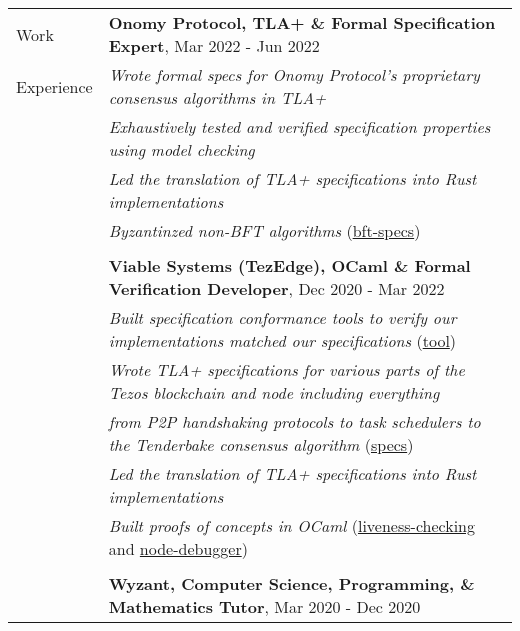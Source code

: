 \documentclass[letterpaper,10pt,oneside]{article}
\begin{document}
\vfill

\noindent \begin{tabular}{@{} l l}
 \Large{Work} & \textbf{Onomy Protocol, TLA+ \& Formal Specification Expert}, Mar 2022 - Jun 2022 \\
 \Large{Experience} & \emph{Wrote formal specs for Onomy Protocol's proprietary consensus algorithms in TLA+} \\
 \hspace{1.1in} & \emph{Exhaustively tested and verified specification properties using model checking} \\
 & \emph{Led the translation of TLA+ specifications into Rust implementations} \\
 & \emph{Byzantinzed non-BFT algorithms} (\href{https://github.com/Isaac-DeFrain/bft_specs}{bft-specs}) \\
 & \\
 & \textbf{Viable Systems (TezEdge), OCaml \& Formal Verification Developer}, Dec 2020 - Mar 2022 \\
 & \emph{Built specification conformance tools to verify our implementations matched our specifications} (\href{https://github.com/Isaac-DeFrain?tab=repositories&q=&type=&language=tla&sort=}{tool}) \\
 & \emph{Wrote TLA+ specifications for various parts of the Tezos blockchain and node including everything} \\
 & \emph{from P2P handshaking protocols to task schedulers to the Tenderbake consensus algorithm} (\href{https://github.com/tezedge/tezedge-specification}{specs}) \\
 & \emph{Led the translation of TLA+ specifications into Rust implementations} \\
 & \emph{Built proofs of concepts in OCaml} (\href{https://github.com/Isaac-DeFrain/liveness-checking}{liveness-checking} and \href{https://github.com/Isaac-DeFrain/node-debugger}{node-debugger}) \\
 & \\
 & \textbf{Wyzant, Computer Science, Programming, \& Mathematics Tutor}, Mar 2020 - Dec 2020 \\

\end{tabular}
\end{document}
